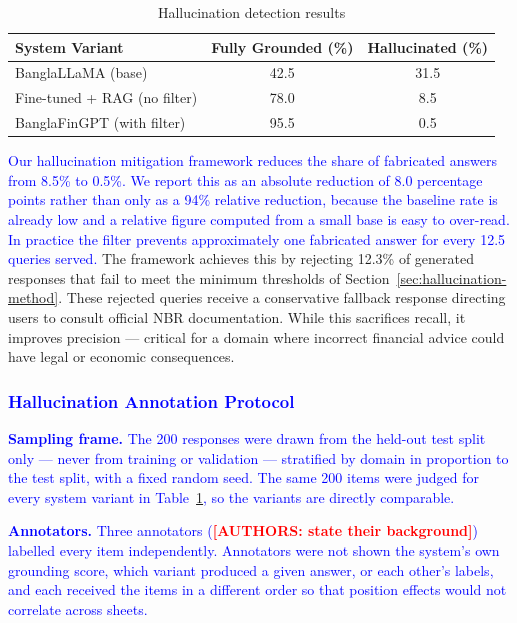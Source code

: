 \documentclass{article}
\newcommand{\revised}[1]{\textcolor{blue}{#1}}
\newcommand{\needsnum}[1]{\textcolor{red}{\textbf{[#1]}}}
\newcommand{\revised}[1]{#1}
\newcommand{\needsnum}[1]{#1}
\begin{document}
\begin{table}[!h]
\caption{Hallucination detection results}
\centering
\small
\begin{tabular}{lcc}
\hline
\textbf{System Variant} & \textbf{Fully Grounded (\%)} & \textbf{Hallucinated (\%)} \\
\hline
BanglaLLaMA (base) & 42.5 & 31.5 \\
Fine-tuned + RAG (no filter) & 78.0 & 8.5 \\
BanglaFinGPT (with filter) & 95.5 & 0.5 \\
\hline
\end{tabular}
\label{tab:hallucination}
\end{table}

\revised{Our hallucination mitigation framework reduces the share of fabricated answers
from 8.5\% to 0.5\%. We report this as an absolute reduction of 8.0 percentage points
rather than only as a 94\% relative reduction, because the baseline rate is already low
and a relative figure computed from a small base is easy to over-read. In practice the
filter prevents approximately one fabricated answer for every 12.5 queries served.} The
framework achieves this by rejecting 12.3\% of generated responses that fail to meet the
minimum thresholds of Section~\ref{sec:hallucination-method}. These rejected queries
receive a conservative fallback response directing users to consult official NBR
documentation. While this sacrifices recall, it improves precision --- critical for a
domain where incorrect financial advice could have legal or economic consequences.

\subsubsection{\revised{Hallucination Annotation Protocol}}
\label{sec:annotation-protocol}

\revised{\textbf{Sampling frame.} The 200 responses were drawn from the held-out test
split only --- never from training or validation --- stratified by domain in proportion
to the test split, with a fixed random seed. The same 200 items were judged for every
system variant in Table~\ref{tab:hallucination}, so the variants are directly
comparable.}

\revised{\textbf{Annotators.} Three annotators
(\needsnum{AUTHORS: state their background}) labelled every item independently.
Annotators were not shown the system's own grounding score, which variant produced a
given answer, or each other's labels, and each received the items in a different order
so that position effects would not correlate across sheets.}
\end{document}
